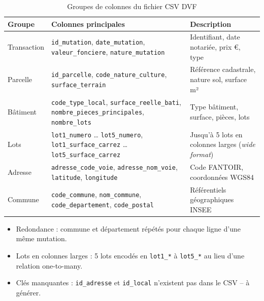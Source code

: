 \documentclass[12pt,a4paper]{article}
\begin{document}
\begin{table}[H]
  \centering
  \begin{tabularx}{\linewidth}{l X X} %
    \toprule
    \textbf{Groupe} & \textbf{Colonnes principales} & \textbf{Description} \\
    \midrule
    Transaction  & \texttt{id\_mutation}, \texttt{date\_mutation}, \texttt{valeur\_fonciere}, \texttt{nature\_mutation}
                 & Identifiant, date notariée, prix €, type \\
    \addlinespace %
    Parcelle     & \texttt{id\_parcelle}, \texttt{code\_nature\_culture}, \texttt{surface\_terrain}
                 & Référence cadastrale, nature sol, surface m² \\
    \addlinespace
    Bâtiment     & \texttt{code\_type\_local}, \texttt{surface\_reelle\_bati}, \texttt{nombre\_pieces\_principales}, \texttt{nombre\_lots}
                 & Type bâtiment, surface, pièces, lots \\
    \addlinespace
    Lots         & \texttt{lot1\_numero} \dots{} \texttt{lot5\_numero}, \texttt{lot1\_surface\_carrez} \dots{} \texttt{lot5\_surface\_carrez}
                 & Jusqu'à 5 lots en colonnes larges (\textit{wide format}) \\
    \addlinespace
    Adresse      & \texttt{adresse\_code\_voie}, \texttt{adresse\_nom\_voie}, \texttt{latitude}, \texttt{longitude}
                 & Code FANTOIR, coordonnées WGS84 \\
    \addlinespace
    Commune      & \texttt{code\_commune}, \texttt{nom\_commune}, \texttt{code\_departement}, \texttt{code\_postal}
                 & Référentiels géographiques INSEE \\
    \bottomrule
  \end{tabularx}
  \caption{Groupes de colonnes du fichier CSV DVF}
\end{table}

\begin{warnbox}
\begin{itemize}[noitemsep]
  \item Redondance : commune et département répétés pour chaque ligne d'une même mutation.
  \item Lots en colonnes larges : 5 lots encodés en \texttt{lot1\_*} à \texttt{lot5\_*} au lieu d'une relation one-to-many.
  \item Clés manquantes : \texttt{id\_adresse} et \texttt{id\_local} n'existent pas dans le CSV -- à générer.
\end{itemize}
\end{warnbox}
\end{document}
